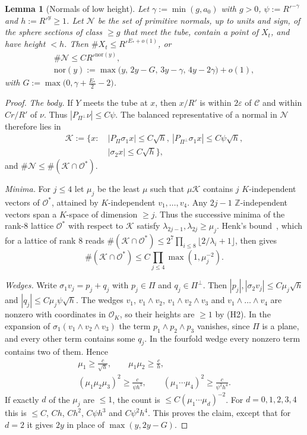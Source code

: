 \documentclass[aps,prx,twocolumn,superscriptaddress,nofootinbib,longbibliography]{revtex4-2}
\theoremstyle{plain}
\newtheorem{lemma}{Lemma}
\theoremstyle{definition}
\theoremstyle{remark}
\newcommand{\Z}{\mathbb{Z}}
\begin{document}
\begin{lemma}[Normals of low height]\label{lem:F5}
Let $\gamma:=\min(g,a_0)$ with $g>0$, $\psi:=R'^{-\gamma}$ and $h:=R'^y\ge1$. Let $\mathcal N$ be the set of primitive normals, up to units and sign, of the sphere sections of class $\ge g$ that meet the tube, contain a point of $X_t$, and have height $<h$. Then $\#X_t\le R'^{E_*+o(1)}$, or
\[
\begin{gathered}
\#\mathcal N\le CR'^{\mathrm{nor}(y)},\\
\mathrm{nor}(y):=\max\big(y,\,2y-G,\,3y-\gamma,\,4y-2\gamma\big)+o(1),
\end{gathered}
\]
with $G:=\max\big(0,\gamma+\tfrac{E_*}2-2\big)$.
\end{lemma}
\begin{proof}
\emph{The body.} If $Y$ meets the tube at $x$, then $x/R'$ is within $2\varepsilon$ of $\mathcal C$ and within $Cr/R'$ of $\nu$. Thus $|P_{\Pi^\perp}\nu|\le C\psi$. The balanced representative of a normal in $\mathcal N$ therefore lies in
\[
\begin{aligned}
\mathcal K:=\{x:\ &|P_\Pi\sigma_1x|\le C\sqrt h,\ |P_{\Pi^\perp}\sigma_1x|\le C\psi\sqrt h,\\ &|\sigma_2x|\le C\sqrt h\},
\end{aligned}
\]
and $\#\mathcal N\le\#(\mathcal K\cap\mathcal O^*)$.

\emph{Minima.} For $j\le4$ let $\mu_j$ be the least $\mu$ such that $\mu\mathcal K$ contains $j$ $K$-independent vectors of $\mathcal O^*$, attained by $K$-independent $v_1,\dots,v_4$. Any $2j-1$ $\Z$-independent vectors span a $K$-space of dimension $\ge j$. Thus the successive minima of the rank-$8$ lattice $\mathcal O^*$ with respect to $\mathcal K$ satisfy $\lambda_{2j-1},\lambda_{2j}\ge\mu_j$. Henk's bound~\cite{Henk}, which for a lattice of rank $8$ reads $\#(\mathcal K\cap\mathcal O^*)\le2^{7}\prod_{i\le8}\lfloor2/\lambda_i+1\rfloor$, then gives
\[
\#(\mathcal K\cap\mathcal O^*)\le C\prod_{j\le4}\max(1,\mu_j^{-2}).
\]

\emph{Wedges.} Write $\sigma_1v_j=p_j+q_j$ with $p_j\in\Pi$ and $q_j\in\Pi^\perp$. Then $|p_j|,|\sigma_2v_j|\le C\mu_j\sqrt h$ and $|q_j|\le C\mu_j\psi\sqrt h$. The wedges $v_1$, $v_1\wedge v_2$, $v_1\wedge v_2\wedge v_3$ and $v_1\wedge\dots\wedge v_4$ are nonzero with coordinates in $\mathcal O_K$, so their heights are $\ge1$ by (H2). In the expansion of $\sigma_1(v_1\wedge v_2\wedge v_3)$ the term $p_1\wedge p_2\wedge p_3$ vanishes, since $\Pi$ is a plane, and every other term contains some $q_j$. In the fourfold wedge every nonzero term contains two of them. Hence
\[
\begin{gathered}
\mu_1\ge\frac c{\sqrt h},\qquad \mu_1\mu_2\ge\frac ch,\\
(\mu_1\mu_2\mu_3)^2\ge\frac c{\psi h^3},\qquad (\mu_1\cdots\mu_4)^2\ge\frac c{\psi^2h^4}.
\end{gathered}
\]
If exactly $d$ of the $\mu_j$ are $\le1$, the count is $\le C(\mu_1\cdots\mu_d)^{-2}$. For $d=0,1,2,3,4$ this is $\le C$, $Ch$, $Ch^2$, $C\psi h^3$ and $C\psi^2h^4$. This proves the claim, except that for $d=2$ it gives $2y$ in place of $\max(y,2y-G)$.


\end{proof}
\end{document}
